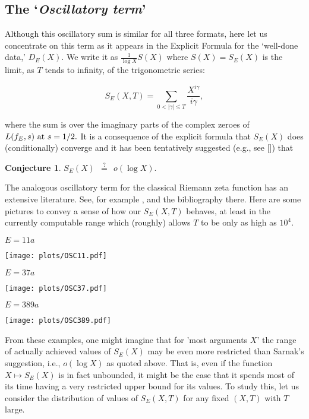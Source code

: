 \documentclass[11pt]{article}
\theoremstyle{plain}
\newtheorem{conjecture}[theorem]{Conjecture}
\theoremstyle{definition}
\numberwithin{equation}{section}
\numberwithin{figure}{section}
\numberwithin{table}{section}
\begin{document}

 \subsection{The `{\it Oscillatory term}'}\label{osc}
  Although this oscillatory sum is similar for all three formats, here let us concentrate on this term as it appears in the Explicit Formula for the `well-done data,'  $D_E(X)$. We write it as  ${\frac{1}{\log X}}S(X)$ where $S(X)=S_E(X)$ is the limit, as $T$ tends to infinity, of the trigonometric series:

  $$S_E(X,T) = \sum_{0<|\gamma| \le T}{\frac{X^{i\gamma}}{i\gamma}},$$

  where the sum is over the imaginary parts of the complex zeroes of  $L(f_E, s)\ {\rm at}\ s=1/2.$   It is a consequence of the explicit formula that $S_E(X)$ does (conditionally) converge and it has been tentatively suggested  (e.g., see [{\cite{S}}]) that

  \begin{conjecture}  $ S_E(X)\ \  {\stackrel{?}{=}}\ \  o(\log X).$\end{conjecture}   The analogous oscillatory term for the classical Riemann zeta function  has an extensive literature. See, for example \cite{G}, \cite{Fu} and the bibliography there. Here are some pictures to convey a sense of how our $S_E(X,T)$ behaves, at least in the currently computable range which (roughly) allows $T$ to be only as high as  $10^4$.

  \newpage
  \centerline{ $E = 11a$}
 \vskip10pt
  \texttt{[image: plots/OSC11.pdf]}

  \centerline{ $E = 37a$}
  \texttt{[image: plots/OSC37.pdf]}
   \vskip20pt
  \centerline{ $E = 389a$}
\vskip20pt
  \texttt{[image: plots/OSC389.pdf]}

 From these examples, one might imagine that for 'most arguments $X$' the range of actually achieved values of $S_E(X)$  may be even more restricted than Sarnak's suggestion, i.e., $o(\log X)$ as quoted above. That is, even if  the function $X \mapsto S_E(X)$ is in fact unbounded, it might be the case that it spends most of its time having a very restricted upper bound for its values.  To study this, let us consider the distribution of values of $S_E(X,T)$ for any fixed $(X,T)$ with $T$ large.
\end{document}

